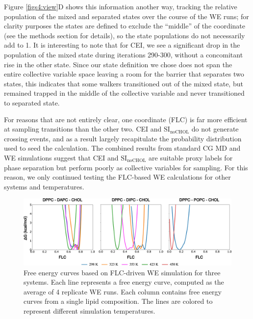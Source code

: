 \documentclass{biophys-new}
\begin{document}
Figure \ref{figs4:view}D shows this information another way, tracking the relative population of the mixed and separated states over the course of the WE runs; for clarity purposes the states are defined to exclude the ``middle'' of the coordinate (see the methods section for details), so the state populations do not necessarily add to 1.
It is interesting to note that for CEI, we see a significant drop in the population of the mixed state during iterations 290-300, without a concomitant rise in the other state.
Since our state definition we chose does not span the entire collective variable space leaving a room for the barrier that separates two states, this indicates that some walkers transitioned out of the mixed state, but remained trapped in the middle of the collective variable and never transitioned to separated state.

For reasons that are not entirely clear, one coordinate (FLC) is far more efficient at sampling transitions than the other two. CEI and $\text{SI}_{\text{noCHOL}}$ do not generate crossing events, and as a result largely recapitulate the probability distribution used to seed the calculation.
The combined results from standard CG MD and WE simulations suggest that CEI and $\text{SI}_{\text{noCHOL}}$ are suitable proxy labels for phase separation but perform poorly as collective variables for sampling.
For this reason, we only continued testing the FLC-based WE calculations for other systems and temperatures.


\begin{figure}[hbt!]
    \centering
    \includegraphics[width=6.5in]{Figures/Main/5/placeholder.jpg}
    \caption{Free energy curves based on FLC-driven WE simulation for three systems. Each line represents a free energy curve, computed as the average of 4 replicate WE runs. Each column contains free energy curves from a single lipid composition. The lines are colored to represent different simulation temperatures.}
    \label{figs5:view}
\end{figure}
\end{document}
